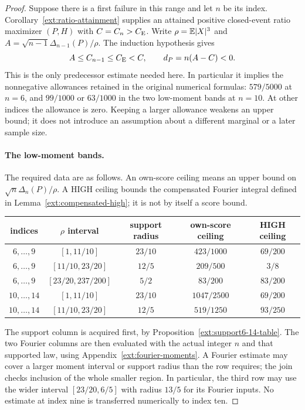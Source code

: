 \begin{proof}
Suppose there is a first failure in this range and let $n$ be its
index. Corollary~\ref{ext:ratio-attainment} supplies an attained
positive closed-event ratio maximizer $(P,H)$ with
$C=C_n>C_{\mathrm E}$. Write $\rho=\mathbb E|X|^3$ and
$A=\sqrt{n-1}\Delta_{n-1}(P)/\rho$. The induction hypothesis gives
\[
 A\le C_{n-1}\le C_{\mathrm E}<C,\qquad d_P=n(A-C)<0.
\]
This is the only predecessor estimate needed here. In particular it
implies the nonnegative allowances retained in the original numerical
formulas: $579/5000$ at $n=6$, and $99/1000$ or $63/1000$ in the two
low-moment bands at $n=10$. At other indices the allowance is zero.
Keeping a larger allowance weakens an upper bound; it does not introduce
an assumption about a different marginal or a later sample size.

\paragraph{The low-moment bands.}
The required data are as follows. An own-score ceiling means an upper
bound on $\sqrt n\Delta_n(P)/\rho$. A HIGH ceiling bounds the
compensated Fourier integral defined in
Lemma~\ref{ext:compensated-high}; it is not by itself a score bound.
\begin{center}\small
\begin{tabular}{@{}ccccc@{}}
\toprule
indices & $\rho$ interval & support radius & own-score ceiling & HIGH ceiling\\
\midrule
$6,\ldots,9$ & $[1,11/10]$ & $23/10$ & $423/1000$ & $69/200$\\
$6,\ldots,9$ & $[11/10,23/20]$ & $12/5$ & $209/500$ & $3/8$\\
$6,\ldots,9$ & $[23/20,237/200]$ & $5/2$ & $83/200$ & $83/200$\\
$10,\ldots,14$ & $[1,11/10]$ & $23/10$ & $1047/2500$ & $69/200$\\
$10,\ldots,14$ & $[11/10,23/20]$ & $12/5$ & $519/1250$ & $93/250$\\
\bottomrule
\end{tabular}
\end{center}
The support column is acquired first, by
Proposition~\ref{ext:support6-14-table}. The two Fourier columns
are then evaluated with the actual integer $n$ and that supported law,
using Appendix~\ref{ext:fourier-moments}. A Fourier estimate may
cover a larger moment interval or support radius than the row requires;
the join checks inclusion of the whole smaller region. In particular,
the third row may use the wider interval $[23/20,6/5]$ with radius
$13/5$ for its Fourier inputs. No estimate at index nine is transferred
numerically to index ten.


\end{proof}
